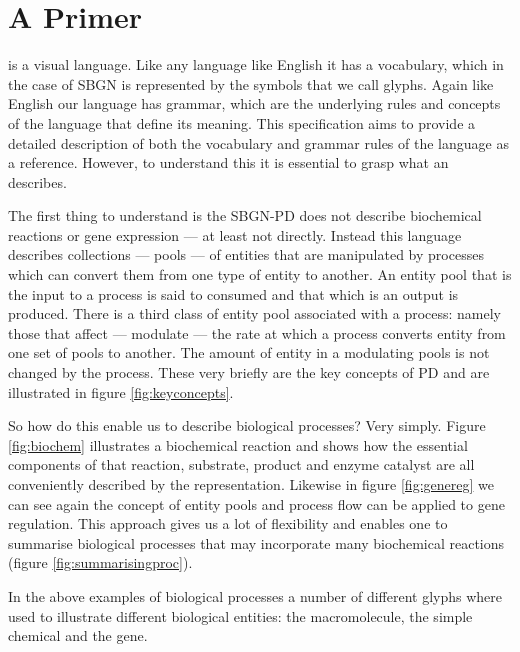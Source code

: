 \chapter{A \PD Primer}

\SBGNPDLone is a visual language. Like any language like English it has a vocabulary, which in the case of SBGN is represented by the symbols that we call glyphs. Again like English our language has grammar, which are the underlying rules and concepts of the language that define its meaning. This specification aims to provide a detailed description of both the vocabulary and grammar rules of the language as a reference. However, to understand this it is essential to grasp what an \PDm describes.

The first thing to understand is the SBGN-PD does not describe biochemical reactions or gene expression --- at least not directly. Instead this language describes collections --- pools --- of entities that are manipulated by processes which can convert them from one type of entity to another. An entity pool that is the input to a process is said to consumed and that which is an output is produced. There is a third class of entity pool associated with a process: namely those that affect --- modulate --- the rate at which a process converts entity from one set of pools to another. The amount of entity in a modulating pools is not changed by the process. These very briefly are the key concepts of PD and are illustrated in figure \ref{fig:keyconcepts}.

So how do this enable us to describe biological processes? Very simply. Figure \ref{fig:biochem} illustrates a biochemical reaction and shows how the essential components of that reaction, substrate, product and enzyme catalyst are all conveniently described by the representation. Likewise in figure \ref{fig:genereg} we can see again the concept of entity pools and process flow can be applied to gene regulation. This approach gives us a lot of flexibility and enables one to summarise biological processes that may incorporate many biochemical reactions (figure \ref{fig:summarisingproc}).



In the above examples of biological processes a number of different glyphs where used to illustrate different biological entities: the macromolecule, the simple chemical and the gene.








